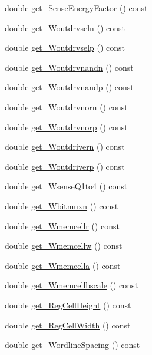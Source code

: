 \begin{DoxyCompactItemize}
\item 
double \hyperlink{classTechParameter_a9148ed63f7966f6116ff77c0015466b9}{get\_\-SenseEnergyFactor} () const 
\item 
double \hyperlink{classTechParameter_a36bd3962b2b2552ed33eea4002a50fcf}{get\_\-Woutdrvseln} () const 
\item 
double \hyperlink{classTechParameter_a939a9e65f510ab907eaf02e64b20f63a}{get\_\-Woutdrvselp} () const 
\item 
double \hyperlink{classTechParameter_ac9b083ac3d196fcf9192115168897c55}{get\_\-Woutdrvnandn} () const 
\item 
double \hyperlink{classTechParameter_a512db72bbf5f101f6f4c85efb9540ca5}{get\_\-Woutdrvnandp} () const 
\item 
double \hyperlink{classTechParameter_ad2649aca227382ec31e1ab27b2336bd1}{get\_\-Woutdrvnorn} () const 
\item 
double \hyperlink{classTechParameter_a599b880e77a44bd7972f6f05aaa5f746}{get\_\-Woutdrvnorp} () const 
\item 
double \hyperlink{classTechParameter_a2688ed045e7fb78d9905aaef19ca89a5}{get\_\-Woutdrivern} () const 
\item 
double \hyperlink{classTechParameter_ac0425084ba57462d4d7f93ffb8e09c31}{get\_\-Woutdriverp} () const 
\item 
double \hyperlink{classTechParameter_aac5dd5fcf5c87ca906df86291eb618c6}{get\_\-WsenseQ1to4} () const 
\item 
double \hyperlink{classTechParameter_aa7d454b609fde3cd37caf2950f96d4f8}{get\_\-Wbitmuxn} () const 
\item 
double \hyperlink{classTechParameter_ae7783acf5faa6167d4fafeb3edb5b6e2}{get\_\-Wmemcellr} () const 
\item 
double \hyperlink{classTechParameter_aa701d7d8fbd2923110f5fce66074ebf8}{get\_\-Wmemcellw} () const 
\item 
double \hyperlink{classTechParameter_ac5fffd2125dc51bcacd7b36db046f93f}{get\_\-Wmemcella} () const 
\item 
double \hyperlink{classTechParameter_a5c685a1e75769a78690fee7f449228f2}{get\_\-Wmemcellbscale} () const 
\item 
double \hyperlink{classTechParameter_ab5d5d4c0a811f4eef47ac4faac45e850}{get\_\-RegCellHeight} () const 
\item 
double \hyperlink{classTechParameter_a48c7337f3503870cebe9c2791fc65045}{get\_\-RegCellWidth} () const 
\item 
double \hyperlink{classTechParameter_ac8316ab367cecbe21444c837c5733f72}{get\_\-WordlineSpacing} () const 

\end{DoxyCompactItemize}
